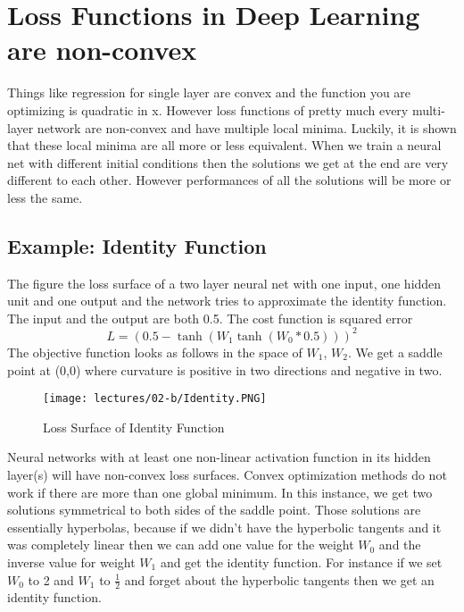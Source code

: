 \chapter{Loss Functions in Deep Learning are non-convex}\label{chp:Loss Functions in Deep Learning are non-convex}

Things like regression for single layer are convex and the function you are optimizing is quadratic in x. However
loss functions of pretty much every multi-layer network are non-convex and have multiple local minima.
Luckily, it is shown that these local minima are all more or less equivalent. 
When we train a neural net with different initial conditions then the solutions we get at the end are very different to each other. 
However performances of all the solutions will be more or less the same. 

\section{Example: Identity Function}
The figure the loss surface of a two layer neural net with one input, one hidden unit and one output and the network tries to approximate the identity function. 
The input and the output are both 0.5. The cost function is squared error 
\begin{equation}
    L = (0.5 - \tanh (W_1 \tanh (W_0 * 0.5)))^2
\end{equation}
The objective function looks as follows in the space of $W_1$, $W_2$. 
We get a saddle point at (0,0) where curvature is positive in two directions and negative in two.\\

\begin{figure}[ht]
\centering
\texttt{[image: lectures/02-b/Identity.PNG]}
\caption{Loss Surface of Identity Function}
\label{fig:idfn}
\end{figure}

Neural networks with at least one non-linear activation function in its hidden layer(s) will have non-convex loss surfaces. 
Convex optimization methods do not work if there are more than one global minimum. 
In this instance, we get two solutions symmetrical to both sides of the saddle point. 
Those solutions are essentially hyperbolas, because if we didn't have the hyperbolic tangents and it was completely linear then we can add one value for the weight $W_0$ and the inverse value for weight $W_1$ and get the identity function. 
For instance if we set $W_0$ to 2 and $W_1$ to $\frac{1}{2}$ and forget about the hyperbolic tangents then we get an identity function.\\

